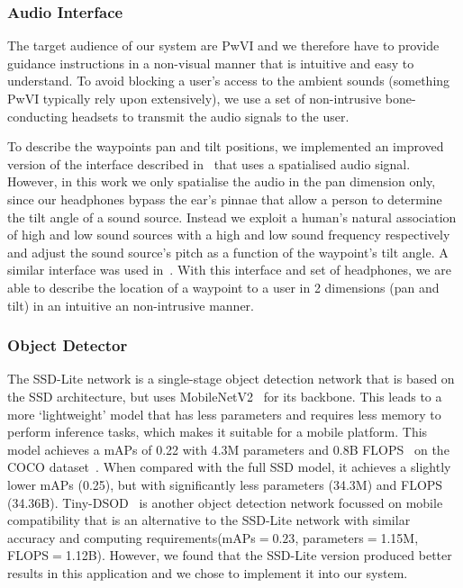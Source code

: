 \documentclass[runningheads]{llncs}
\begin{document}
\subsubsection{Audio Interface}

The target audience of our system are PwVI and we therefore have to provide guidance instructions in a non-visual manner that is intuitive and easy to understand. 
To avoid blocking a user's access to the ambient sounds (something PwVI typically rely upon extensively), we use a set of non-intrusive bone-conducting headsets to transmit the audio signals to the user. 

To describe the waypoints pan and tilt positions, we implemented an improved version of the interface described in~\cite{bellotto2013} that uses a spatialised audio signal.
However, in this work we only spatialise the audio in the pan dimension only, since our headphones bypass the ear's pinnae that allow a person to determine the tilt angle of a sound source. 
Instead we exploit a human's natural association of high and low sound sources with a high and low sound frequency respectively~\cite{blauert1997spatial} and adjust the sound source's pitch as a function of the waypoint's tilt angle. 
A similar interface was used in~\cite{schauerte2012assistive}.
With this interface and set of headphones, we are able to describe the location of a waypoint to a user in 2 dimensions (pan and tilt) in an intuitive an non-intrusive manner. 

\subsubsection{Object Detector}

The SSD-Lite network is a single-stage object detection network that is based on the SSD architecture, but uses MobileNetV2~\cite{sandler2018mobilenetv2} for its backbone.
This leads to a more `lightweight' model that has less parameters and requires less memory to perform inference tasks, which makes it suitable for a mobile platform. 
This model achieves a mAPs of 0.22 with 4.3M parameters and 0.8B FLOPS~\cite{li2018tinydsod} on the COCO dataset~\cite{lin2014microsoft}. 
When compared with the full SSD model, it achieves a slightly lower mAPs (0.25), but with significantly less parameters (34.3M) and FLOPS (34.36B).
Tiny-DSOD~\cite{li2018tinydsod} is another object detection network focussed on mobile compatibility that is an alternative to the SSD-Lite network with similar accuracy and computing requirements(mAPs$=0.23$, parameters$=$1.15M, FLOPS$=$1.12B).
However, we found that the SSD-Lite version produced better results in this application and we chose to implement it into our system.
\end{document}
